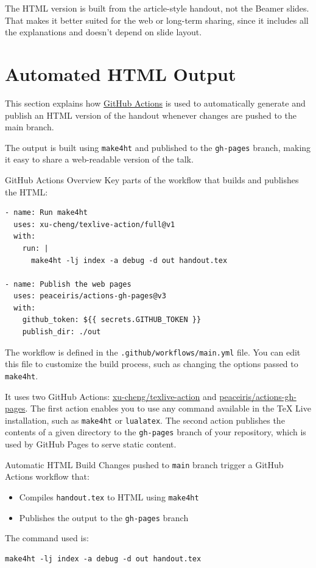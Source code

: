 The HTML version is built from the article-style handout, not the Beamer
slides. That makes it better suited for the web or long-term sharing, since it
includes all the explanations and doesn’t depend on slide layout.

\section{Automated HTML Output}
This section explains how \href{https://docs.github.com/en/actions/writing-workflows/quickstart}{GitHub Actions} is used to automatically generate and
publish an HTML version of the handout whenever changes are pushed to the main
branch.

The output is built using \texttt{make4ht} and published to the
\texttt{gh-pages} branch, making it easy to share a web-readable version of the
talk. 

\begin{frame}[fragile]{GitHub Actions Overview}
Key parts of the workflow that builds and publishes the HTML:

\begin{verbatim}
- name: Run make4ht
  uses: xu-cheng/texlive-action/full@v1
  with:
    run: |
      make4ht -lj index -a debug -d out handout.tex

- name: Publish the web pages
  uses: peaceiris/actions-gh-pages@v3
  with:
    github_token: ${{ secrets.GITHUB_TOKEN }}
    publish_dir: ./out
\end{verbatim}

\end{frame}

The workflow is defined in the \texttt{.github/workflows/main.yml} file. 
You can edit this file to customize the build process, such as changing the
options passed to \texttt{make4ht}.

It uses two GitHub Actions: \href{https://github.com/xu-cheng/texlive-action}{xu-cheng/texlive-action}
and \href{https://github.com/peaceiris/actions-gh-pages}{peaceiris/actions-gh-pages}. 
The first action enables you to use any command available in the TeX Live installation, 
such as \texttt{make4ht} or \texttt{lualatex}. The second action publishes the contents of a 
given directory to the \texttt{gh-pages} branch of your repository, which is
used by GitHub Pages to serve static content.



\begin{frame}[fragile]{Automatic HTML Build}
Changes pushed to \texttt{main} branch trigger a GitHub Actions workflow that:

\begin{itemize}
  \item Compiles \texttt{handout.tex} to HTML using \texttt{make4ht}
  \item Publishes the output to the \texttt{gh-pages} branch
\end{itemize}

The command used is:

\begin{verbatim}
make4ht -lj index -a debug -d out handout.tex
\end{verbatim}
\end{frame}

